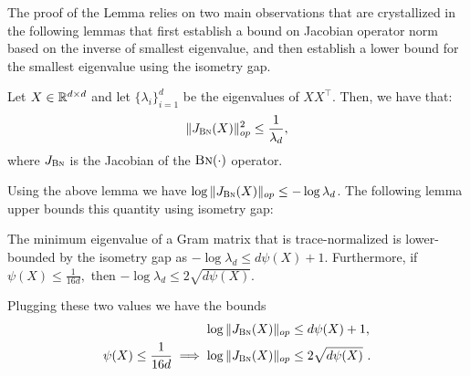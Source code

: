 The proof of the Lemma relies on two main observations that are crystallized in the following lemmas that first establish a bound on Jacobian operator norm based on the inverse of smallest eigenvalue, and then establish a lower bound for the smallest eigenvalue using the isometry gap. 

\begin{lemma}
\label{grad:lem:jacobian_batchnorm_op_norm_bound}
    Let $X \in \mathbb{R}^{d \times d}$ and let $\{\lambda_i\}_{i=1}^d$ be the eigenvalues of $XX^\top$. Then, we have that:
    \begin{align}
        \| J_{\text{\sc{Bn}}}(X) \|_{op}^2 \leq \frac{1}{ \lambda_d},
    \end{align}
    where $J_{\text{\sc{Bn}}}$ is the Jacobian of the $\text{\sc{Bn}}(\cdot)$ operator.
\end{lemma}


Using the above lemma we have $\log \|J_{\text{\sc{Bn}}}(X)\|_{op}\le -\log \lambda_d$. The following lemma upper bounds this quantity using isometry gap: 
\begin{lemma}
\label{grad:lem:iso_gap_min_eig}
    The minimum eigenvalue of a Gram matrix that is trace-normalized is lower-bounded by the isometry gap as $-\log\lambda_d \le d\psi(X) + 1.$ Furthermore, if $\psi(X)\le \frac{1}{16d},$ then $-\log\lambda_d\le 2\sqrt{d\psi(X)}$.
\end{lemma}

Plugging these two values we have the bounds
\begin{align}
    \log\|J_{\text{\sc{Bn}}}(X)\|_{op} &\le d\psi(X)+1 \label{grad:eqn:fix}, \\
    \psi(X) \le \frac{1}{16d} \implies \log\|J_{\text{\sc{Bn}}}(X)\|_{op} &\le 2\sqrt{d\psi(X)}~.
\end{align}


